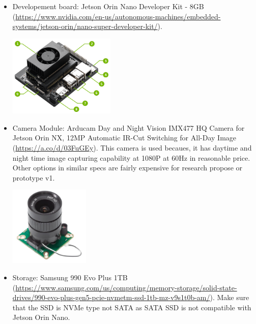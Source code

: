 \documentclass[12pt,hidelinks]{article}
\begin{document}
            \sloppy
            \begin{itemize}
                \item Developement board: Jetson Orin Nano Developer Kit - 8GB ({\footnotesize \url{https://www.nvidia.com/en-us/autonomous-machines/embedded-systems/jetson-orin/nano-super-developer-kit/}}).
                \\
                \begin{center}
                    \includegraphics[width=0.4\textwidth]{pics/jetson-orin-nano-front_numbered.png}
                    \label{fig:jetson}
                \end{center}
                

                \item Camera Module: Arducam Day and Night Vision IMX477 HQ Camera for Jetson Orin NX, 12MP Automatic IR-Cut Switching for All-Day Image ({\footnotesize \url{https://a.co/d/03FuGEy}}). This camera is used becaues, it has daytime and night time image capturing capability at 1080P at 60Hz in reasonable price. Other options in similar specs are fairly expensive for research propose or prototype v1.
                \\
                \begin{center}
                    \includegraphics[width=0.3\textwidth]{pics/ArduCam_camera.jpg}
                    \label{fig:arducam}
                \end{center}
                

                \item Storage: Samsung 990 Evo Plus 1TB ({\footnotesize \url{https://www.samsung.com/us/computing/memory-storage/solid-state-drives/990-evo-plus-gen5-pcie-nvmetm-ssd-1tb-mz-v9s1t0b-am/}}). Make sure that the SSD is NVMe type not SATA as SATA SSD is not compatible with Jetson Orin Nano.
                \\


\end{itemize}
\end{document}
